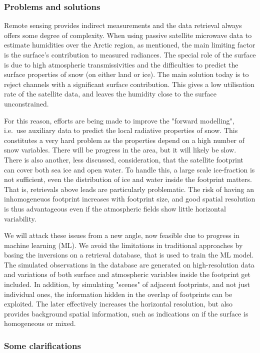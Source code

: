 \documentclass[12pt,oneside,a4paper]{article}
\begin{document}
\subsubsection{Problems and solutions}

Remote sensing provides indirect measurements and the data retrieval always
offers some degree of complexity. When using passive satellite microwave data
to estimate humidities over the Arctic region, as mentioned, the main
limiting factor is the surface's contribution to measured radiances. The
special role of the surface is due to high atmospheric transmissivities and the
difficulties to predict the surface properties of snow (on either land or ice).
The main solution today is to reject channels with a significant surface
contribution. This gives a low utilisation rate of the satellite data, and
leaves the humidity close to the surface unconstrained.

For this reason, efforts are being made to improve the "forward modelling",
i.e.\ use auxiliary data to predict the local radiative properties of snow. This
constitutes a very hard problem as the properties depend on a high number of
snow variables. There will be progress in the area, but it will likely be slow.
There is also another, less discussed, consideration, that the satellite
footprint can cover both sea ice and open water. To handle this, a large scale
ice-fraction is not sufficient, even the distribution of ice and water inside
the footprint matters. That is, retrievals above leads are particularly
problematic. The risk of having an inhomogeneuos footprint increases with
footprint size, and good spatial resolution is thus advantageous even if the
atmospheric fields show little horizontal variability.

We will attack these issues from a new angle, now feasible due to progress in
machine learning (ML). We avoid the limitations in traditional approaches by
basing the inversions on a retrieval database, that is used to train the ML
model. The simulated observations in the database are generated on
high-resolution data and variations of both surface and atmospheric variables
inside the footprint get included. In addition, by simulating "scenes" of
adjacent footprints, and not just individual ones, the information hidden in
the overlap of footprints can be exploited. The later effectively increases the
horizontal resolution, but also provides background spatial information, such
as indications on if the surface is homogeneous or mixed.


\subsubsection{Some clarifications}
\end{document}
